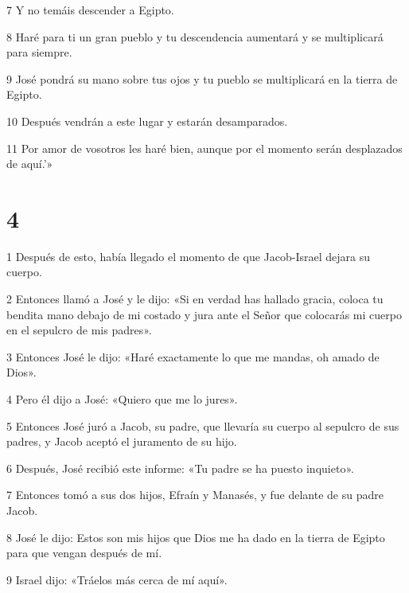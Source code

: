 \par 7 Y no temáis descender a Egipto.

\par 8 Haré para ti un gran pueblo y tu descendencia aumentará y se multiplicará para siempre.

\par 9 José pondrá su mano sobre tus ojos y tu pueblo se multiplicará en la tierra de Egipto.

\par 10 Después vendrán a este lugar y estarán desamparados.

\par 11 Por amor de vosotros les haré bien, aunque por el momento serán desplazados de aquí.'»

\chapter{4}

\par 1 Después de esto, había llegado el momento de que Jacob-Israel dejara su cuerpo.

\par 2 Entonces llamó a José y le dijo: «Si en verdad has hallado gracia, coloca tu bendita mano debajo de mi costado y jura ante el Señor que colocarás mi cuerpo en el sepulcro de mis padres».

\par 3 Entonces José le dijo: «Haré exactamente lo que me mandas, oh amado de Dios».

\par 4 Pero él dijo a José: «Quiero que me lo jures».

\par 5 Entonces José juró a Jacob, su padre, que llevaría su cuerpo al sepulcro de sus padres, y Jacob aceptó el juramento de su hijo.

\par 6 Después, José recibió este informe: «Tu padre se ha puesto inquieto».

\par 7 Entonces tomó a sus dos hijos, Efraín y Manasés, y fue delante de su padre Jacob.

\par 8 José le dijo: Estos son mis hijos que Dios me ha dado en la tierra de Egipto para que vengan después de mí.

\par 9 Israel dijo: «Tráelos más cerca de mí aquí».

